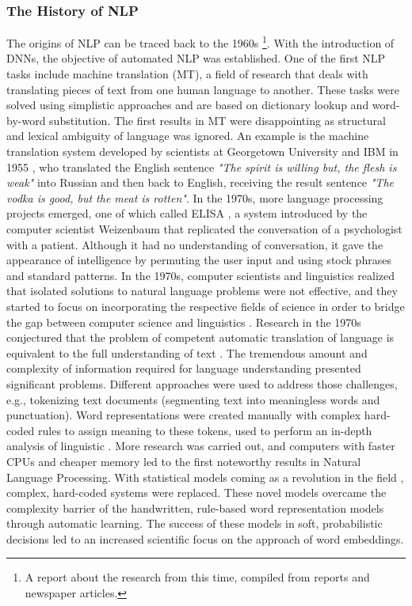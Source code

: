 \subsubsection{The History of NLP}
    \label{sec:the_history_of_NLP}
The origins of NLP can be traced back to the 1960s \cite{dostert1955georgetown, Hutchins2006TheFP}\footnote{A report about the research from this time, compiled from reports and newspaper articles.}. With the introduction of DNNs, the objective of automated NLP was established. One of the first NLP tasks include machine translation (MT), a field of research that deals with translating pieces of text from one human language to another. These tasks were solved using simplistic approaches and are based on dictionary lookup and word-by-word substitution. 
The first results in MT were disappointing as structural and lexical ambiguity of language was ignored. An example is the machine translation system developed by scientists at Georgetown University and IBM in 1955 \cite{dostert1955georgetown}, who translated the English sentence \textit{"The spirit is willing but, the flesh is weak"} into Russian and then back to English, receiving the result sentence \textit{"The vodka is good, but the meat is rotten"}.
 In the 1970s, more language processing projects emerged, one of which called ELISA \cite{weizenbaum1966eliza}, a system introduced by the computer scientist Weizenbaum that replicated the conversation of a psychologist with a patient. Although it had no understanding of conversation, it gave the appearance of intelligence by permuting the user input and using stock phrases and standard patterns. In the 1970s, computer scientists and linguistics realized that isolated solutions to natural language problems were not effective, and they started to focus on incorporating the respective fields of science in order to bridge the gap between computer science and linguistics \cite{kumar2011natural}. 
 Research in the 1970s conjectured that the problem of competent automatic translation of language is equivalent to the full understanding of text \cite{carbonell1981steps}. The tremendous amount and complexity of information required for language understanding presented significant problems.  Different approaches were used to address those challenges, e.g., tokenizing text documents (segmenting text into meaningless words and punctuation). Word representations were created manually with complex hard-coded rules to assign meaning to these tokens, used to perform an in-depth analysis of linguistic \cite{catania1972chomsky}. 
 More research was carried out, and computers with faster CPUs and cheaper memory led to the first noteworthy results in Natural Language Processing.  With statistical models coming as a revolution in the field \cite{bahl1989tree}, complex, hard-coded systems were replaced. 
 These novel models overcame the complexity barrier of the handwritten, rule-based word representation models through automatic learning. The success of these models in soft, probabilistic decisions led to an increased scientific focus on the approach of word embeddings.
 
